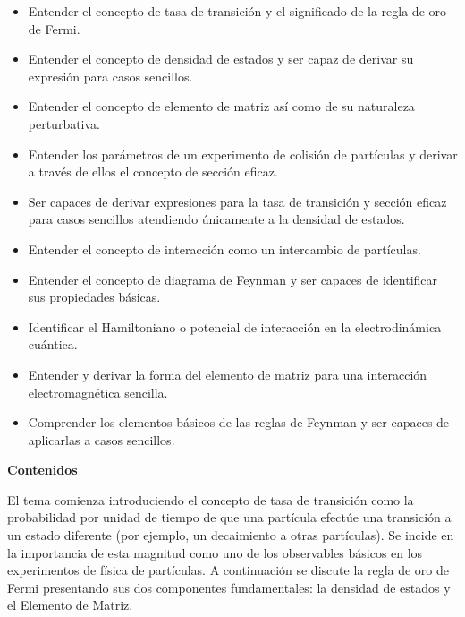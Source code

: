 \begin{itemize}
    \item Entender el concepto de tasa de transición y el significado de la regla de oro de Fermi.
    \item Entender el concepto de densidad de estados y ser capaz de derivar su expresión para casos sencillos.
    \item Entender el concepto de elemento de matriz así como de su naturaleza perturbativa.
    \item Entender los parámetros de un experimento de colisión de partículas y derivar a través de ellos el concepto de sección eficaz.
    \item Ser capaces de derivar expresiones para la tasa de transición y sección eficaz para casos sencillos atendiendo únicamente a la densidad de estados.
    \item Entender el concepto de interacción como un intercambio de partículas. 
    \item Entender el concepto de diagrama de Feynman y ser capaces de identificar sus propiedades básicas.
    \item Identificar el Hamiltoniano o potencial de interacción en la electrodinámica cuántica.
    \item Entender y derivar la forma del elemento de matriz para una interacción electromagnética sencilla.
    \item Comprender los elementos básicos de las reglas de Feynman y ser capaces de aplicarlas a casos sencillos.
\end{itemize}

\textbf{Contenidos}

El tema comienza introduciendo el concepto de tasa de transición como la probabilidad por unidad de tiempo de que una partícula efectúe una transición a un estado diferente (por ejemplo, un decaimiento a otras partículas). Se incide en la importancia de esta magnitud como uno de los observables básicos en los experimentos de física de partículas. A continuación se discute la regla de oro de Fermi presentando sus dos componentes fundamentales: la densidad de estados y el Elemento de Matriz. 

